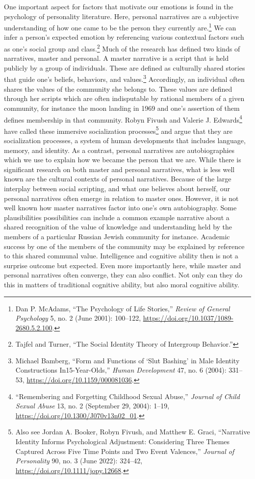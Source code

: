 \documentclass[phdthesis,12pt,final]{wuthesis}
\theoremstyle{definition}
\theoremstyle{definition}
\theoremstyle{definition}
\theoremstyle{definition}
\theoremstyle{remark}
\begin{document}
One important aspect for factors that motivate our emotions is found in the psychology of personality literature. Here, personal narratives are a subjective understanding of how one came to be the person they currently are.\footnote{Dan P. McAdams, {``The {Psychology} of {Life Stories},''} \emph{Review of General Psychology} 5, no. 2 (June 2001): 100--122, \url{https://doi.org/10.1037/1089-2680.5.2.100}.} We can infer a person's expected emotion by referencing various contextual factors such as one's social group and class.\footnote{Tajfel and Turner, {``The {Social Identity Theory} of {Intergroup Behavior}.''}} Much of the research has defined two kinds of narratives, master and personal. A master narrative is a script that is held publicly by a group of individuals. These are defined as culturally shared stories that guide one's beliefs, behaviors, and values.\footnote{Michael Bamberg, {``Form and {Functions} of {`{Slut Bashing}'} in {Male Identity Constructions} In15-{Year-Olds},''} \emph{Human Development} 47, no. 6 (2004): 331--53, \url{https://doi.org/10.1159/000081036}.} Accordingly, an individual often shares the values of the community she belongs to. These values are defined through her scripts which are often indisputable by rational members of a given community, for instance the moon landing in 1969 and one's assertion of them defines membership in that community. Robyn Fivush and Valerie J. Edwards\footnote{{``Remembering and {Forgetting Childhood Sexual Abuse},''} \emph{Journal of Child Sexual Abuse} 13, no. 2 (September 29, 2004): 1--19, \url{https://doi.org/10.1300/J070v13n02_01}.} have called these immersive socialization processes\footnote{Also see Jordan A. Booker, Robyn Fivush, and Matthew E. Graci, {``Narrative {Identity Informs Psychological Adjustment}: {Considering} Three Themes Captured Across Five Time Points and Two Event Valences,''} \emph{Journal of Personality} 90, no. 3 (June 2022): 324--42, \url{https://doi.org/10.1111/jopy.12668}.} and argue that they are socialization processes, a system of human developments that includes language, memory, and identity. As a contrast, personal narratives are autobiographies which we use to explain how we became the person that we are. While there is significant research on both master and personal narratives, what is less well known are the cultural contexts of personal narratives. Because of the large interplay between social scripting, and what one believes about herself, our personal narratives often emerge in relation to master ones. However, it is not well known how master narratives factor into one's own autobiography. Some plausibilities possibilities can include a common example narrative about a shared recognition of the value of knowledge and understanding held by the members of a particular Russian Jewish community for instance. Academic success by one of the members of the community may be explained by reference to this shared communal value. Intelligence and cognitive ability then is not a surprise outcome but expected. Even more importantly here, while master and personal narratives often converge, they can also conflict. Not only can they do this in matters of traditional cognitive ability, but also moral cognitive ability.
\end{document}
